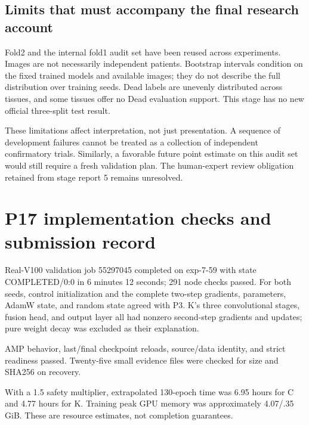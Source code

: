 \documentclass[11pt,a4paper]{article}
\begin{document}
\subsection{Limits that must accompany the final research account}

Fold2 and the internal fold1 audit set have been reused across experiments. Images are not necessarily independent patients. Bootstrap intervals condition on the fixed trained models and available images; they do not describe the full distribution over training seeds. Dead labels are unevenly distributed across tissues, and some tissues offer no Dead evaluation support. This stage has no new official three-split test result.

These limitations affect interpretation, not just presentation. A sequence of development failures cannot be treated as a collection of independent confirmatory trials. Similarly, a favorable future point estimate on this audit set would still require a fresh validation plan. The human-expert review obligation retained from stage report 5 remains unresolved.

\clearpage
\appendix
\section{P17 implementation checks and submission record}

Real-V100 validation job 55297045 completed on exp-7-59 with state COMPLETED/0:0 in 6 minutes 12 seconds; 291 node checks passed. For both seeds, control initialization and the complete two-step gradients, parameters, AdamW state, and random state agreed with P3. K's three convolutional stages, fusion head, and output layer all had nonzero second-step gradients and updates; pure weight decay was excluded as their explanation.

AMP behavior, last/final checkpoint reloads, source/data identity, and strict readiness passed. Twenty-five small evidence files were checked for size and SHA256 on recovery.

With a 1.5 safety multiplier, extrapolated 130-epoch time was 6.95 hours for C and 4.77 hours for K. Training peak GPU memory was approximately 4.07/.35 GiB. These are resource estimates, not completion guarantees.
\end{document}
